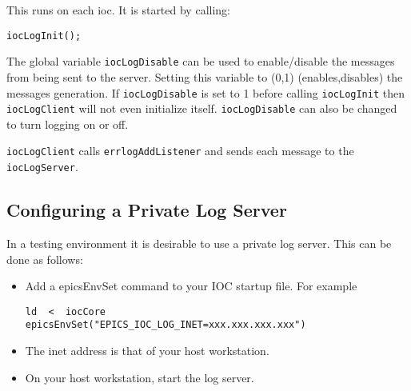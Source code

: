 This runs on each ioc. It is started by calling:

\begin{verbatim}iocLogInit();
\end{verbatim}The global variable \verb|iocLogDisable| can be used to enable/disable the messages from being sent to the server. Setting 
this variable to (0,1) (enables,disables) the messages generation. If \verb|iocLogDisable| is set to 1 before calling 
\verb|iocLogInit| then \verb|iocLogClient| will not even initialize itself. \verb|iocLogDisable| can also be changed to turn 
logging on or off.

\verb|iocLogClient| calls \verb|errlogAddListener| and sends each message to the \verb|iocLogServer|.

\subsection{Configuring a Private Log Server}

In a testing environment it is desirable to use a private log server. This can be done as follows:

\begin{itemize}

\item Add a epicsEnvSet command to your IOC startup file. For example

\begin{verbatim}ld  <  iocCore
epicsEnvSet("EPICS_IOC_LOG_INET=xxx.xxx.xxx.xxx")
\end{verbatim}

\item The inet address is that of your host workstation.

\item On your host workstation, start the log server.

\end{itemize}

